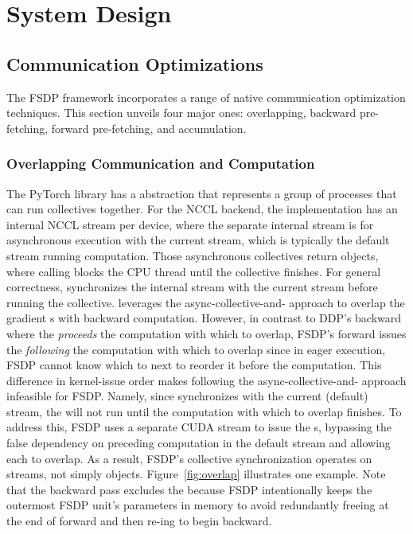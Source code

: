 \section{System Design}\label{sec:design}






\subsection{Communication Optimizations}

The FSDP framework incorporates a range of native communication optimization techniques. This section unveils four major ones: overlapping, backward pre-fetching, forward pre-fetching, and accumulation. 

\subsubsection{Overlapping Communication and Computation} \hfill \break

The PyTorch  library has a  abstraction that represents a group of processes that can run collectives together. For the NCCL backend, the  implementation has an internal NCCL stream per device, where the separate internal stream is for asynchronous execution with the current stream, which is typically the default stream running computation. Those asynchronous collectives return  objects, where calling  blocks the CPU thread until the collective finishes. For general correctness,  synchronizes the internal stream with the current stream before running the collective.  leverages the async-collective-and- approach to overlap the gradient s with backward computation. However, in contrast to DDP's backward where the  \textit{proceeds} the computation with which to overlap, FSDP's forward issues the  \textit{following} the computation with which to overlap since in eager execution, FSDP cannot know which  to  next to reorder it before the computation. This difference in kernel-issue order makes following the async-collective-and- approach infeasible for FSDP. Namely, since  synchronizes with the current (default) stream, the  will not run until the computation with which to overlap finishes. To address this, FSDP uses a separate CUDA stream to issue the s, bypassing the false dependency on preceding computation in the default stream and allowing each  to overlap. As a result, FSDP's collective synchronization operates on streams, not simply  objects. Figure~\ref{fig:overlap} illustrates one example. Note that the backward pass excludes the   because FSDP intentionally keeps the outermost FSDP unit's parameters in memory to avoid redundantly freeing at the end of forward and then re-ing to begin backward.

